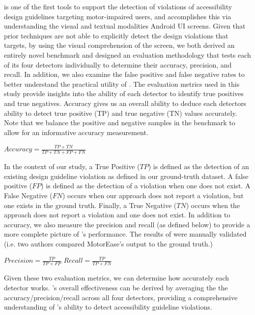 \MotorEase is one of the first tools to support the detection of violations of accessibility design guidelines targeting motor-impaired users, and accomplishes this via understanding the visual and textual modalities Android UI screens. 
Given that prior techniques are not able to explicitly detect the design violations that \MotorEase targets, by using the visual comprehension of the screen, we both derived an entirely novel benchmark and designed an evaluation methodology that tests each of its four detectors individually to determine their accuracy, precision, and recall. In addition, we also examine the false positive and false negative rates to better understand the practical utility of \MotorEase. The evaluation metrics used in this study provide insights into the ability of each detector to identify true positives and true negatives. Accuracy gives us an overall ability to deduce each detectors ability to detect true positive (TP) and true negative (TN) values accurately. Note that we balance the positive and negative samples in the \MotorCheck benchmark to allow for an informative accuracy measurement.
	
	\begin{center}$Accuracy = \frac{TP+TN}{TP+TN+FP+FN}$\end{center}
	
\noindent In the context of our study, a True Positive ($TP$) is defined as the detection of an existing design guideline violation as defined in our ground-truth dataset. A false positive ($FP$) is defined as the detection of a violation when one does not exist. A False Negative ($FN$) occurs when our approach does not report a violation, but one exists in the ground truth. Finally, a True Negative ($TN$) occurs when the approach does not report a violation and one does not exist. In addition to accuracy, we also measure the precision and recall (as defined below) to provide a more complete picture of \MotorEase's performance. The results of \MotorEase were manually validated (i.e. two authors compared MotorEase's output to the ground truth.)
	
	\begin{center}$Precision = \frac{TP}{TP+FP}$ \hspace{1em}$Recall = \frac{TP}{TP+FN}$\end{center}

		
\noindent Given these two evaluation metrics, we can determine how accurately each detector works. \MotorEase's overall effectiveness can be derived by averaging the the accuracy/precision/recall across all four detectors, providing a comprehensive understanding of \MotorEase's ability to detect accessibility guideline violations. 


